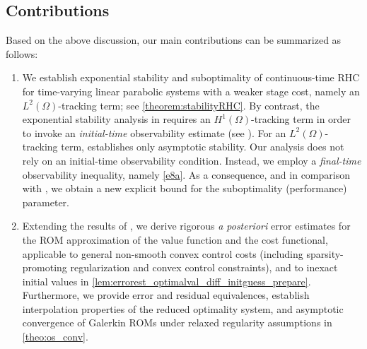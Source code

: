 \documentclass{m2an}
\begin{document}
\subsection{Contributions}
%
Based on the above discussion, our main contributions can be summarized as follows:
%
\begin{enumerate}
%

    \item {We establish exponential stability and suboptimality of continuous-time RHC for time-varying linear parabolic systems with a weaker stage cost, namely an $L^2(\Omega)$-tracking term; see \cref{theorem:stabilityRHC}. By contrast, the exponential stability analysis in \cite[Prop.~2.1 and Thm.~6.2]{azmi2019hybrid} requires an $H^1(\Omega)$-tracking term in order to invoke an \emph{initial-time} observability estimate (see \cite[Assumption~\textbf{P3} in Section~2]{azmi2019hybrid}). For an $L^2(\Omega)$-tracking term, \cite[Thm.~6.4]{azmi2019hybrid} establishes only asymptotic stability. Our analysis does not rely on an initial-time observability condition. Instead, we employ a \emph{final-time} observability inequality, namely \cref{e8a}. As a consequence, and in comparison with \cite{azmi2019hybrid,RA12}, we obtain a new explicit bound for the suboptimality (performance) parameter.}

    \item Extending the results of \cite{ran,dietze2023reduced}, we derive rigorous \textit{a posteriori} error estimates for the ROM approximation of the value function and the cost functional, applicable to general non-smooth convex control costs (including sparsity-promoting regularization and convex control constraints), and to inexact initial values {in} \cref{lem:errorest_optimalval_diff_initguess_prepare}.
    Furthermore, we provide error and residual equivalences, establish interpolation properties of the reduced optimality system, and asymptotic convergence of Galerkin ROMs under relaxed regularity assumptions in \cref{theo:os_conv}.
    

\end{enumerate}
\end{document}
